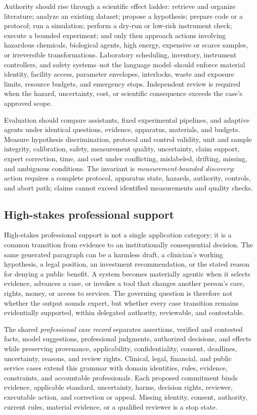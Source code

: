 Authority should rise through a scientific effect ladder: retrieve and organize literature; analyze an existing dataset; propose a hypothesis; prepare code or a protocol; run a simulation; perform a dry-run or low-risk instrument check; execute a bounded experiment; and only then approach actions involving hazardous chemicals, biological agents, high energy, expensive or scarce samples, or irreversible transformations. Laboratory scheduling, inventory, instrument controllers, and safety systems--not the language model--should enforce material identity, facility access, parameter envelopes, interlocks, waste and exposure limits, resource budgets, and emergency stops. Independent review is required when the hazard, uncertainty, cost, or scientific consequence exceeds the case's approved scope.

Evaluation should compare assistants, fixed experimental pipelines, and adaptive agents under identical questions, evidence, apparatus, materials, and budgets. Measure hypothesis discrimination, protocol and control validity, unit and sample integrity, calibration, safety, measurement quality, uncertainty, claim support, expert correction, time, and cost under conflicting, mislabeled, drifting, missing, and ambiguous conditions. The invariant is \emph{measurement-bounded discovery}: action requires a complete protocol, apparatus state, hazards, authority, controls, and abort path; claims cannot exceed identified measurements and quality checks.

\subsection{High-stakes professional support}

High-stakes professional support is not a single application category; it is a common transition from evidence to an institutionally consequential decision. The same generated paragraph can be a harmless draft, a clinician's working hypothesis, a legal position, an investment recommendation, or the stated reason for denying a public benefit. A system becomes materially agentic when it selects evidence, advances a case, or invokes a tool that changes another person's care, rights, money, or access to services. The governing question is therefore not whether the output sounds expert, but whether every case transition remains evidentially supported, within delegated authority, reviewable, and contestable.

The shared \emph{professional case record} separates assertions, verified and contested facts, model suggestions, professional judgments, authorized decisions, and effects while preserving provenance, applicability, confidentiality, consent, deadlines, uncertainty, reasons, and review rights. Clinical, legal, financial, and public service cases extend this grammar with domain identities, rules, evidence, constraints, and accountable professionals. Each proposed commitment binds evidence, applicable standard, uncertainty, harms, decision rights, reviewer, executable action, and correction or appeal. Missing identity, consent, authority, current rules, material evidence, or a qualified reviewer is a stop state.

